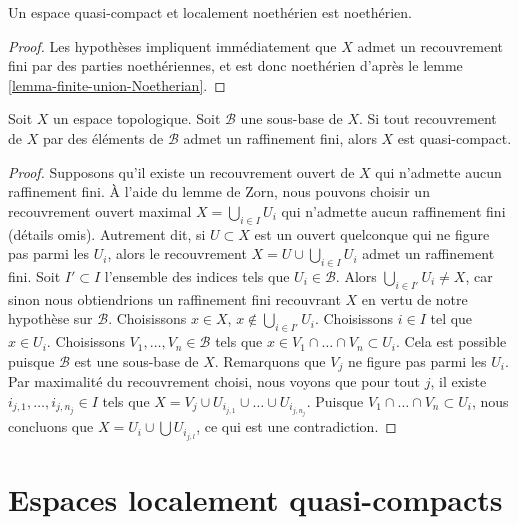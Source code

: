 \begin{lemma}
\label{lemma-quasi-compact-locally-Noetherian-Noetherian}
Un espace quasi-compact et localement noethérien est noethérien.
\end{lemma}

\begin{proof}
Les hypothèses impliquent immédiatement que $X$ admet un recouvrement fini par
des parties noethériennes, et est donc noethérien d'après le
lemme \ref{lemma-finite-union-Noetherian}.
\end{proof}

\begin{lemma}
\label{lemma-subbase-theorem}
Soit $X$ un espace topologique. Soit $\mathcal{B}$ une sous-base de $X$.
Si tout recouvrement de $X$ par des éléments de $\mathcal{B}$ admet un
raffinement fini, alors $X$ est quasi-compact.
\end{lemma}

\begin{proof}
Supposons qu'il existe un recouvrement ouvert de $X$ qui n'admette aucun
raffinement fini. À l'aide du lemme de Zorn, nous pouvons choisir un recouvrement ouvert maximal
$X = \bigcup_{i \in I} U_i$ qui n'admette aucun raffinement fini
(détails omis).
Autrement dit, si $U \subset X$ est un ouvert quelconque qui ne figure pas
parmi les $U_i$, alors le recouvrement $X = U \cup \bigcup_{i \in I} U_i$
admet un raffinement fini. Soit $I' \subset I$ l'ensemble des indices
tels que $U_i \in \mathcal{B}$. Alors $\bigcup_{i \in I'} U_i \not = X$,
car sinon nous obtiendrions un raffinement fini recouvrant $X$ en vertu de notre
hypothèse sur $\mathcal{B}$. Choisissons $x \in X$,
$x \not \in \bigcup_{i \in I'} U_i$. Choisissons $i \in I$ tel que $x \in U_i$.
Choisissons $V_1, \ldots, V_n \in \mathcal{B}$ tels que
$x \in V_1 \cap \ldots \cap V_n \subset U_i$. Cela est
possible puisque $\mathcal{B}$ est une sous-base de $X$. Remarquons que
$V_j$ ne figure pas parmi les $U_i$. Par maximalité du
recouvrement choisi, nous voyons que pour tout $j$, il existe
$i_{j, 1}, \ldots, i_{j, n_j} \in I$ tels que
$X = V_j \cup U_{i_{j, 1}} \cup \ldots \cup U_{i_{j, n_j}}$.
Puisque $V_1 \cap \ldots \cap V_n \subset U_i$, nous concluons que
$X = U_i \cup \bigcup U_{i_{j, l}}$, ce qui est une contradiction.
\end{proof}







\section{Espaces localement quasi-compacts}
\label{section-locally-quasi-compact}

